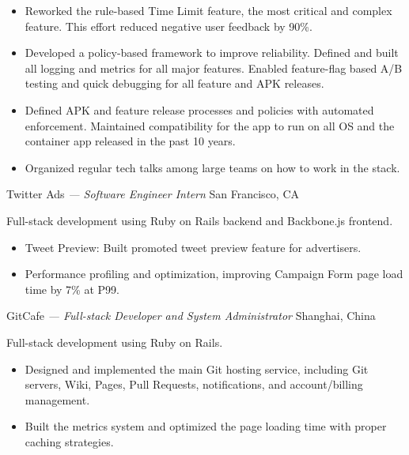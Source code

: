 \documentclass[]{friggeri-cv}
\begin{document}
\begin{entrylist}
{    \begin{itemize}
      \item Reworked the rule-based Time Limit feature, the most critical and complex feature.
      This effort reduced negative user feedback by 90\%.
      \item Developed a policy-based framework to improve reliability.
      Defined and built all logging and metrics for all major features.
      Enabled feature-flag based A/B testing and quick debugging for all feature and APK releases.
      \item Defined APK and feature release processes and policies with automated enforcement.
      Maintained compatibility for the app to run on all OS and the container app released in the past 10 years.
      \item Organized regular tech talks among large teams on how to work in the stack.
    \end{itemize}
  }
  {Twitter Ads \emph{--- Software Engineer Intern}}
  {San Francisco, CA}
  {
    Full-stack development using Ruby on Rails backend and Backbone.js frontend.
    \begin{itemize}
      \item Tweet Preview: Built promoted tweet preview feature for advertisers.
      \item Performance profiling and optimization, improving Campaign Form page load time by 7\% at P99.
    \end{itemize}
  }
  {GitCafe \emph{--- Full-stack Developer and System Administrator}}
  {Shanghai, China}
  {
    Full-stack development using Ruby on Rails.
    \begin{itemize}
      \item Designed and implemented the main Git hosting service, including Git servers, Wiki, Pages,
      Pull Requests, notifications, and account/billing management.
      \item Built the metrics system and optimized the page loading time with proper caching strategies.
    \end{itemize}
  }
\end{entrylist}

\pagebreak

\end{document}
